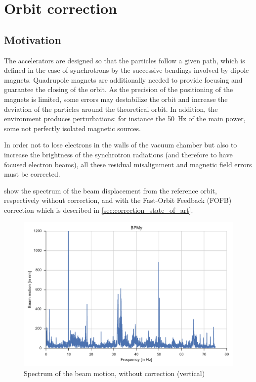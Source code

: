 
\chapter{Orbit correction}
\label{sec:correction}

\section{Motivation}
The accelerators are designed so that the particles follow a given path, which is defined in the case of synchrotrons by the successive bendings involved by dipole magnets. Quadrupole magnets are additionally needed to provide focusing and guarantee the closing of the orbit. As the precision of the positioning of the magnets is limited, some errors may destabilize the orbit and increase the deviation of the particles around the theoretical orbit. In addition, the environment produces perturbations: for instance the 50~Hz of the main power, some not perfectly isolated magnetic sources.

In order not to lose electrons in the walls of the vacuum chamber but also to increase the brightness of the synchrotron radiations (and therefore to have focused electron beams), all these residual misalignment and magnetic field errors must be corrected.

 show the spectrum of the beam displacement from the reference orbit, respectively without correction, and with the Fast-Orbit Feedback (FOFB) correction which is described in \cref{sec:correction_state_of_art}.

\begin{figure}
    \centering
    \includegraphics[width=.9\linewidth]{img/fft_no_corr}
    \caption{\label{fig:fft_no_correction} Spectrum of the beam motion, without correction (vertical)}
\end{figure}


